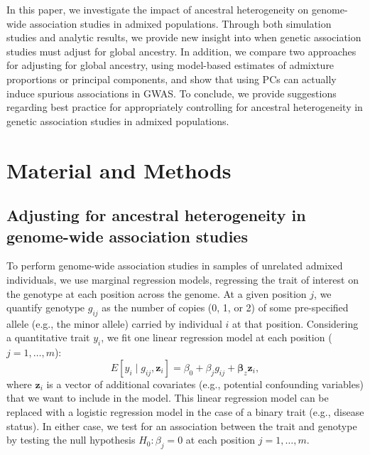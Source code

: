 \documentclass[12pt]{article}
\newcommand{\edit}[1]{{\color{red}{#1}}}
\begin{document}
In this paper, we investigate the impact of ancestral heterogeneity on genome-wide association studies in admixed populations.
Through both simulation studies and analytic results, we provide new insight into when genetic association studies must adjust for global ancestry.
In addition, we compare two approaches for adjusting for global ancestry, using model-based estimates of admixture proportions or principal components, and show that using PCs can actually induce spurious associations in GWAS.
To conclude, we provide suggestions regarding best practice for appropriately controlling for ancestral heterogeneity in genetic association studies in admixed populations.

\edit{Reframe so that we're really focused on LD filtering --> move some of this from methods to intro}

\section{Material and Methods}


\subsection{Adjusting for ancestral heterogeneity in  genome-wide association studies}

To perform genome-wide association studies in samples of unrelated admixed individuals, we use marginal regression models, regressing the trait of interest on the genotype at each position across the genome. 
At a given position $j$, we quantify genotype $g_{ij}$ as the number of copies (0, 1, or 2) of some pre-specified allele (e.g., the minor allele) carried by individual $i$ at that position. 
Considering a quantitative trait $y_i$, we fit one linear regression model at each position ($j = 1, \dots, m$): $$E[y_i \mid g_{ij}, \mathbf{z}_i] = \beta_0 + \beta_j g_{ij} + \boldsymbol{\beta}_z \mathbf{z}_i,$$ where $\mathbf{z}_i$ is a vector of additional covariates (e.g., potential confounding variables) that we want to include in the model.
This linear regression model can be replaced with a logistic regression model in the case of a binary trait (e.g., disease status).
In either case, we test for an association between the trait and genotype by testing the null hypothesis $H_0: \beta_j = 0$ at each position $j = 1, \dots, m$.
\end{document}
